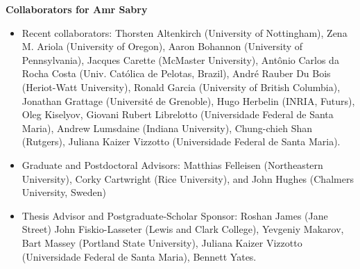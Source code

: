 \documentclass[11pt]{article}
\begin{document}

\begin{center}
{\Large {\bf Collaborators for Amr Sabry}}
\end{center}

\begin{itemize}
\item Recent collaborators:
  Thorsten Altenkirch (University of Nottingham),
  Zena M. Ariola (University of Oregon),
  Aaron Bohannon (University of Pennsylvania),
  Jacques Carette (McMaster University),
  Ant\^onio Carlos da Rocha Costa (Univ. Cat\'olica de Pelotas, Brazil),
  Andr\'e Rauber Du Bois (Heriot-Watt University),
  Ronald Garcia (University of British Columbia),
  Jonathan Grattage (Universit\'e de Grenoble),
  Hugo Herbelin (INRIA, Futurs),
  Oleg Kiselyov,
  Giovani Rubert Librelotto (Universidade Federal de Santa Maria),
  Andrew Lumsdaine (Indiana University),
  Chung-chieh Shan (Rutgers),    
  Juliana Kaizer Vizzotto (Universidade Federal de Santa Maria).

\item Graduate and Postdoctoral Advisors: Matthias Felleisen (Northeastern
  University), Corky Cartwright (Rice University), and John Hughes (Chalmers
  University, Sweden)

\item Thesis Advisor and Postgraduate-Scholar Sponsor: 
    Roshan James (Jane Street) 
    John Fiskio-Lasseter (Lewis and Clark College), 
    Yevgeniy Makarov,
    Bart Massey (Portland State University),
    Juliana Kaizer Vizzotto (Universidade Federal de Santa Maria),
    Bennett Yates.
 
\end{itemize}
\end{document}

